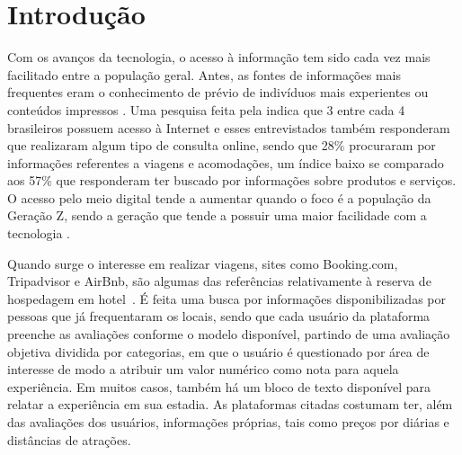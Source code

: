 
\chapter[Introdução]{Introdução}
\label{cap:intro}


Com os avanços da tecnologia, o acesso à informação tem sido cada vez mais facilitado entre a população geral. Antes, as fontes de informações mais frequentes eram o conhecimento de prévio de indivíduos mais experientes ou conteúdos impressos \cite{jayathilake2021critical}. Uma pesquisa feita pela  indica que 3 entre cada 4 brasileiros possuem acesso à Internet e esses entrevistados também responderam que realizaram algum tipo de consulta online, sendo que 28\% procuraram por informações referentes a viagens e acomodações, um índice baixo se comparado aos 57\% que responderam ter buscado por informações sobre produtos e serviços. O acesso pelo meio digital tende a aumentar quando o foco é a população da Geração Z, sendo a geração que tende a possuir uma maior facilidade com a tecnologia \cite{sfodera2022technology}.

Quando surge o interesse em realizar viagens, sites como Booking.com, Tripadvisor e AirBnb, são algumas das referências relativamente à reserva de hospedagem em hotel~. É feita uma busca por informações disponibilizadas por pessoas que já frequentaram os locais, sendo que cada usuário da plataforma preenche as avaliações conforme o modelo disponível, partindo de uma avaliação objetiva dividida por categorias, em que o usuário é questionado por área de interesse de modo a atribuir um valor numérico como nota para aquela experiência. Em muitos casos, também há um bloco de texto disponível para relatar a experiência em sua estadia. As plataformas citadas costumam ter, além das avaliações dos usuários, informações próprias, tais como preços por diárias e distâncias de atrações.

